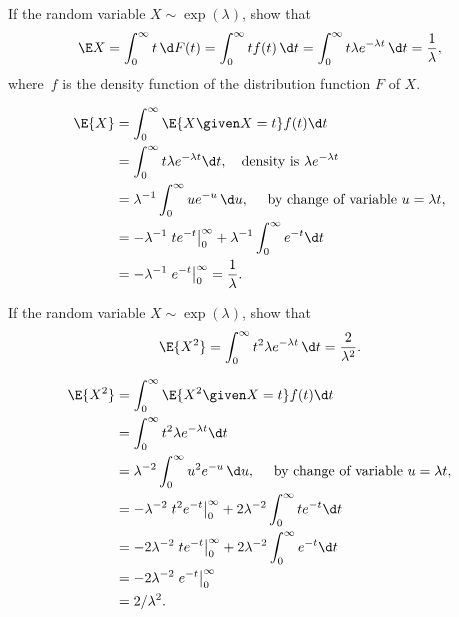 \begin{question} 
  If the random variable $X\sim\exp(\lambda)$, show that
 \begin{equation*}
    \E X = \int_0^\infty t \,\d F(t) = \int_0^\infty t f(t)\, \d t =
    \int_0^\infty t \lambda e^{-\lambda t}\, \d t = \frac{1}\lambda,
  \end{equation*}
  where~$f$ is the density function of the distribution function $F$ of $X$.
  \begin{solution}
    \begin{equation*}
      \begin{split}
\E{X} 
&= \int_0^\infty \E{X\given X=t} f(t) \d t \\
&= \int_0^\infty t \lambda e^{-\lambda t} \d t, \quad\text{density is } \lambda e^{-\lambda t} \\
&=   \lambda^{-1} \int_0^\infty u e^{-u}\, \d u, \quad \text{ by  change of variable $u=\lambda t$},   \\
&=  -\lambda^{-1}\left. t e^{- t}\right|_0^\infty + \lambda^{-1} \int_0^\infty e^{- t} \d t\\
&=  - \lambda^{-1} \left. e^{- t} \right|_0^\infty =  \frac1\lambda.
      \end{split}
    \end{equation*}
  \end{solution}
\end{question}


\begin{question} 
  If the random variable $X\sim\exp(\lambda)$, show that
  \begin{equation*}
  \E{X^2}= \int_0^\infty t^2 \lambda e^{-\lambda t}\, \d t =  \frac{2}{\lambda^2}.
  \end{equation*}
  \begin{solution}
    \begin{equation*}
      \begin{split}
\E{X^2} 
&= \int_0^\infty \E{X^2\given X=t} f(t) \d t \\
&= \int_0^\infty t^2 \lambda e^{-\lambda t} \d t \\
&=   \lambda^{-2} \int_0^\infty u^2 e^{-u}\, \d u, \quad \text{ by  change of variable $u=\lambda t$},   \\
&= -\lambda^{-2}\left. t^2 e^{- t}\right|_0^\infty + 2\lambda^{-2}\int_0^\infty t e^{- t} \d t \\
&=  -2\lambda^{-2}\left. t e^{- t}\right|_0^\infty + 2\lambda^{-2} \int_0^\infty e^{- t} \d t\\
&=  - 2\lambda^{-2} \left. e^{- t} \right|_0^\infty \\
&=  2/\lambda^2.
      \end{split}
    \end{equation*}
  \end{solution}
\end{question}

